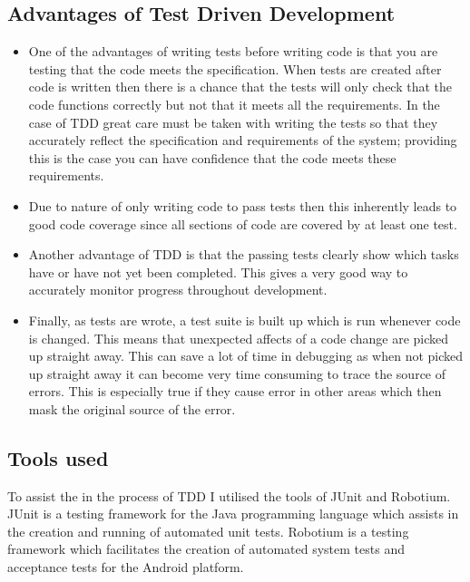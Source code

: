 \subsection{Advantages of Test Driven Development}

\begin{itemize}
	\item One of the advantages of writing tests before writing code is that you are testing that  the code meets the specification. When tests are created after code is written then there is a chance that the tests will only check that the code functions correctly but not that it meets all the requirements. In the case of TDD great care must be taken with writing the tests so that they accurately reflect the specification and requirements of the system; providing this is the case you can have confidence that the code meets these requirements.

	\item Due to nature of only writing code to pass tests then this inherently leads to good code coverage since all sections of code are covered by at least one test.

	\item Another advantage of TDD is that the passing tests clearly show which tasks have or have not yet been completed. This gives a very good way to accurately monitor progress throughout development.

	\item Finally, as tests are wrote, a test suite is built up which is run whenever code is changed. This means that unexpected affects of a code change are picked up straight away. This can save a lot of time in debugging as when not picked up straight away it can become very time consuming to trace the source of errors. This is especially true if they cause error in other areas which then mask the original source of the error.
\end{itemize}

\subsection{Tools used}

To assist the in the process of TDD I utilised the tools of JUnit and Robotium. JUnit is a testing framework for the Java programming language which assists in the creation and running of automated unit tests. Robotium is a testing framework which facilitates the creation of automated system tests and acceptance tests for the Android platform.

